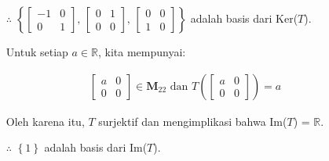 \documentclass[12pt, a4paper]{scrartcl}
\begin{document}
\begin{enumerate}
\begin{enumerate}
            \begin{itemize}
                \item[$\therefore$] $\left\{\begin{bmatrix}
                    -1&0\\0&1
                \end{bmatrix}\mbox{, }\begin{bmatrix}
                    0&1\\0&0
                \end{bmatrix}\mbox{, }\begin{bmatrix}
                    0&0\\1&0
                \end{bmatrix}\right\}$ adalah basis dari Ker($T$).
            \end{itemize}

            \begin{itemize}
                \item[] Untuk setiap $a \in \mathbb{R}$, kita mempunyai:
            \end{itemize}
            \begin{align*}
                \begin{bmatrix}
                    a&0\\0&0
                \end{bmatrix} \in \textbf{M}_{22} \mbox{ dan } T\left(\begin{bmatrix}
                    a&0\\0&0
                \end{bmatrix}\right) = a
            \end{align*}
            \begin{itemize}
                \item[] Oleh karena itu, $T$ surjektif dan mengimplikasi bahwa Im($T$) = $\mathbb{R}$.
            \end{itemize}

            \begin{itemize}
                \item[$\therefore$] $\left\{1\right\}$ adalah basis dari Im($T$).
            \end{itemize}
            
        \end{enumerate}

        \pagebreak


\end{enumerate}
\end{document}
